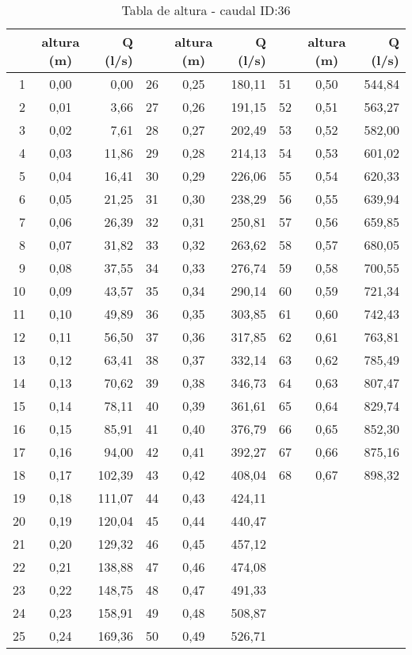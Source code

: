 \documentclass[]{article}
\begin{document}
\begin{table}[H]

\caption{Tabla de altura - caudal ID:36}
\centering

\begin{center}
\begingroup\fontsize{10pt}{11pt}\selectfont
\begin{tabular}{rcrrcrrcr}
  \hline
 & altura (m) & Q (l/s) &  & altura (m) & Q (l/s) &  & altura (m) & Q (l/s) \\ 
  \hline
  1 & 0,00 & 0,00 &  26 & 0,25 & 180,11 &  51 & 0,50 & 544,84 \\ 
    2 & 0,01 & 3,66 &  27 & 0,26 & 191,15 &  52 & 0,51 & 563,27 \\ 
    3 & 0,02 & 7,61 &  28 & 0,27 & 202,49 &  53 & 0,52 & 582,00 \\ 
    4 & 0,03 & 11,86 &  29 & 0,28 & 214,13 &  54 & 0,53 & 601,02 \\ 
    5 & 0,04 & 16,41 &  30 & 0,29 & 226,06 &  55 & 0,54 & 620,33 \\ 
    6 & 0,05 & 21,25 &  31 & 0,30 & 238,29 &  56 & 0,55 & 639,94 \\ 
    7 & 0,06 & 26,39 &  32 & 0,31 & 250,81 &  57 & 0,56 & 659,85 \\ 
    8 & 0,07 & 31,82 &  33 & 0,32 & 263,62 &  58 & 0,57 & 680,05 \\ 
    9 & 0,08 & 37,55 &  34 & 0,33 & 276,74 &  59 & 0,58 & 700,55 \\ 
   10 & 0,09 & 43,57 &  35 & 0,34 & 290,14 &  60 & 0,59 & 721,34 \\ 
   11 & 0,10 & 49,89 &  36 & 0,35 & 303,85 &  61 & 0,60 & 742,43 \\ 
   12 & 0,11 & 56,50 &  37 & 0,36 & 317,85 &  62 & 0,61 & 763,81 \\ 
   13 & 0,12 & 63,41 &  38 & 0,37 & 332,14 &  63 & 0,62 & 785,49 \\ 
   14 & 0,13 & 70,62 &  39 & 0,38 & 346,73 &  64 & 0,63 & 807,47 \\ 
   15 & 0,14 & 78,11 &  40 & 0,39 & 361,61 &  65 & 0,64 & 829,74 \\ 
   16 & 0,15 & 85,91 &  41 & 0,40 & 376,79 &  66 & 0,65 & 852,30 \\ 
   17 & 0,16 & 94,00 &  42 & 0,41 & 392,27 &  67 & 0,66 & 875,16 \\ 
   18 & 0,17 & 102,39 &  43 & 0,42 & 408,04 &  68 & 0,67 & 898,32 \\ 
   19 & 0,18 & 111,07 &  44 & 0,43 & 424,11 &  &  &  \\ 
   20 & 0,19 & 120,04 &  45 & 0,44 & 440,47 &  &  &  \\ 
   21 & 0,20 & 129,32 &  46 & 0,45 & 457,12 &  &  &  \\ 
   22 & 0,21 & 138,88 &  47 & 0,46 & 474,08 &  &  &  \\ 
   23 & 0,22 & 148,75 &  48 & 0,47 & 491,33 &  &  &  \\ 
   24 & 0,23 & 158,91 &  49 & 0,48 & 508,87 &  &  &  \\ 
   25 & 0,24 & 169,36 &  50 & 0,49 & 526,71 &  &  &  \\ 
   \hline
\end{tabular}
\endgroup\end{center}
\end{table}
\end{document}

